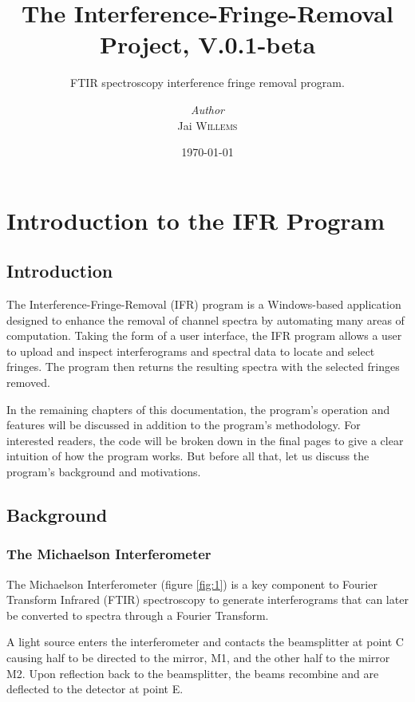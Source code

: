 \documentclass[a4paper, 12pt]{report}
\institute{Canadian Light Source}
\title{The Interference-Fringe-Removal Project, V.0.1-beta}
\subtitle{FTIR spectroscopy interference fringe removal program.}
\author{\textit{Author}\\Jai \textsc{Willems}}
\date{\today}
\begin{document}
    \maketitle
    \romantableofcontents
    
    


    \chapter{Introduction to the IFR Program}
    
    \section{Introduction}
    The Interference-Fringe-Removal (IFR) program is a Windows-based application designed to enhance the removal of channel spectra by automating many areas of computation. Taking the form of a user interface, the IFR program allows a user to upload and inspect interferograms and spectral data to locate and select fringes. The program then returns the resulting spectra with the selected fringes removed.
    
    In the remaining chapters of this documentation, the program's operation and features will be discussed in addition to the program's methodology. For interested readers, the code will be broken down in the final pages to give a clear intuition of how the program works. But before all that, let us discuss the program's background and motivations.
    
    \section{Background}
    \subsection{The Michaelson Interferometer}

    The Michaelson Interferometer (figure \ref{fig:1}) is a key component to Fourier Transform Infrared (FTIR) spectroscopy to generate interferograms that can later be converted to spectra through a Fourier Transform.
    
    A light source enters the interferometer and contacts the beamsplitter at point C causing half to be directed to the mirror, M1, and the other half to the mirror M2. Upon reflection back to the beamsplitter, the beams recombine and are deflected to the detector at point E.
    
\end{document}
